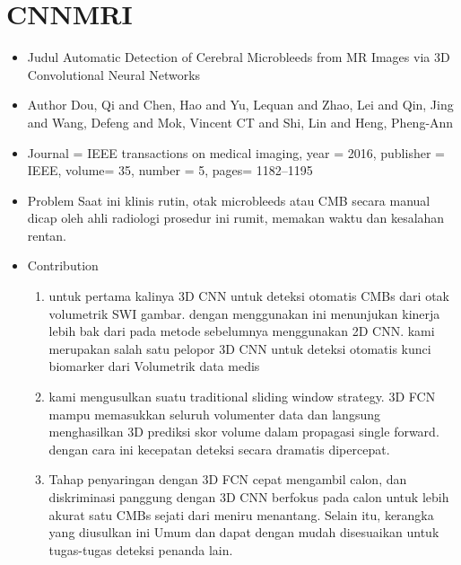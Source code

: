 \section{CNNMRI}
\begin{itemize}
\item Judul
Automatic Detection of Cerebral Microbleeds from MR Images via 3D Convolutional Neural Networks 

\item Author
Dou, Qi and Chen, Hao and Yu, Lequan and Zhao, Lei and Qin, Jing and Wang, Defeng and Mok, Vincent CT and Shi, Lin and Heng, Pheng-Ann

\item Journal = IEEE transactions on medical imaging, year = 2016, publisher = IEEE, volume= 35, number = 5, pages= 1182--1195

\item Problem
Saat ini klinis rutin, otak microbleeds atau CMB secara manual dicap oleh ahli radiologi prosedur ini rumit, memakan waktu dan kesalahan rentan.

\item Contribution 
 \begin{enumerate}
\item untuk pertama kalinya 3D CNN untuk deteksi otomatis  CMBs dari otak volumetrik SWI gambar. dengan menggunakan ini menunjukan kinerja lebih bak dari pada metode sebelumnya menggunakan 2D CNN.  kami merupakan salah satu pelopor 3D CNN untuk deteksi otomatis kunci biomarker dari Volumetrik data medis
\item kami mengusulkan suatu traditional sliding window strategy. 3D FCN mampu memasukkan seluruh volumenter data dan langsung menghasilkan 3D prediksi skor volume dalam propagasi single forward. dengan cara ini kecepatan deteksi secara dramatis dipercepat.
\item Tahap penyaringan dengan 3D FCN cepat mengambil calon, dan diskriminasi panggung dengan 3D CNN berfokus pada calon untuk lebih akurat satu CMBs sejati dari meniru menantang. Selain itu, kerangka yang diusulkan ini Umum dan dapat dengan mudah disesuaikan untuk tugas-tugas deteksi penanda lain. 
\end{enumerate}


\end{itemize}
